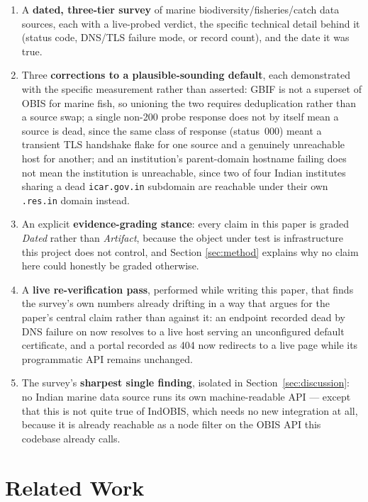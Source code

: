 \begin{enumerate}\itemsep2pt
\item A \textbf{dated, three-tier survey} of \NSourcesSurveyed{} marine
biodiversity/fisheries/catch data sources, each with a live-probed verdict,
the specific technical detail behind it (status code, DNS/TLS failure mode,
or record count), and the date it was true.
\item Three \textbf{corrections to a plausible-sounding default}, each
demonstrated with the specific measurement rather than asserted: GBIF is not
a superset of OBIS for marine fish, so unioning the two requires
deduplication rather than a source swap; a single non-200 probe response
does not by itself mean a source is dead, since the same class of response
(status~000) meant a transient TLS handshake flake for one source and a
genuinely unreachable host for another; and an institution's parent-domain
hostname failing does not mean the institution is unreachable, since two of
four Indian institutes sharing a dead \texttt{icar.gov.in} subdomain are
reachable under their own \texttt{.res.in} domain instead.
\item An explicit \textbf{evidence-grading stance}: every claim in this paper
is graded \emph{Dated} rather than \emph{Artifact}, because the object under
test is infrastructure this project does not control, and Section
\ref{sec:method} explains why no claim here could honestly be graded
otherwise.
\item A \textbf{live re-verification pass}, performed while writing this
paper, that finds the survey's own numbers already drifting in a way that
argues for the paper's central claim rather than against it: an endpoint
recorded dead by DNS failure on \ProbeDate{} now resolves to a live host
serving an unconfigured default certificate, and a portal recorded as 404
now redirects to a live page while its programmatic API remains unchanged.
\item The survey's \textbf{sharpest single finding}, isolated in
Section~\ref{sec:discussion}: no Indian marine data source runs its own
machine-readable API --- except that this is not quite true of IndOBIS, which
needs no new integration at all, because it is already reachable as a node
filter on the OBIS API this codebase already calls.
\end{enumerate}

\section{Related Work}
\label{sec:related}

